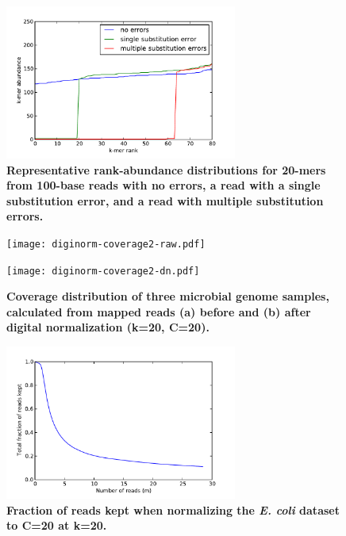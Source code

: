 \documentclass{pnastwo}
\begin{document}
\begin{article}
\begin{thebibliography}{20}


\end{thebibliography}

\end{article}

\newpage

\begin{figure}
\centerline{\includegraphics[width=3in]{diginorm-ranks.pdf}}
\caption{
{\bf Representative rank-abundance distributions for 20-mers from 100-base reads with no errors,
a read with a single substitution error, and a read with multiple
substitution errors.}}
\label{fig:rankabund}
\end{figure}

\begin{figure}
\centerline{\texttt{[image: diginorm-coverage2-raw.pdf]}}
\centerline{\texttt{[image: diginorm-coverage2-dn.pdf]}}
\caption{
{\bf Coverage distribution of three microbial genome samples, calculated
from mapped reads (a) before and (b) after digital normalization (k=20, C=20).}}
\label{fig:coverage}
\end{figure}

\begin{figure}
\centerline{\includegraphics[width=3in]{diginorm-accumulation.pdf}}
\caption{
{\bf Fraction of reads kept when normalizing the {\em E. coli} dataset to C=20 at k=20.}}
\label{fig:accumulate}
\end{figure}
\end{document}

